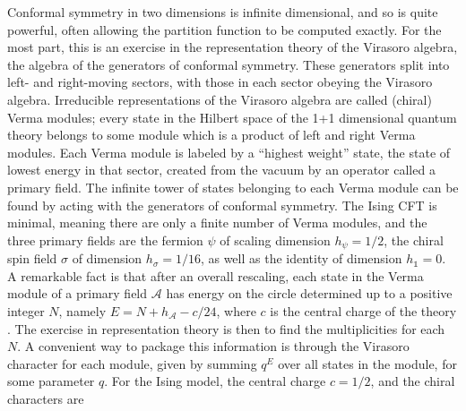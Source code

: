 \documentclass[11pt]{article}
\numberwithin{equation}{section}		%
\begin{document}
Conformal symmetry in two dimensions is infinite dimensional, and so is quite powerful, often allowing the partition function to be computed exactly. For the most part, this is an exercise in the representation theory of the Virasoro algebra, the algebra of the generators of conformal symmetry. These generators split into left- and right-moving sectors, with those in each sector obeying the Virasoro algebra. 
Irreducible representations of the Virasoro algebra are called (chiral) Verma modules; every state in the Hilbert space of the 1+1 dimensional quantum theory belongs to some module which is a product of left and right Verma modules.
Each Verma module is labeled by a ``highest weight'' state, the state of lowest energy in that sector, created from the vacuum by an operator called a primary field. The infinite tower of states belonging to each Verma module can be found by acting with the generators 
of conformal symmetry. 
The Ising CFT is minimal, meaning there are only a finite number of Verma modules, and the three primary fields are the fermion $\psi$ of scaling dimension $h_\psi=1/2$, the chiral spin field $\sigma$ of dimension $h_\sigma=1/16$, as well as the identity of dimension $h_{\mathds{1}}=0$. 
A remarkable fact is that after an overall rescaling, 
each state in the Verma module of a primary field $\mathcal{A}$ has energy on the circle determined up to a positive integer $N$, namely $E = N + h_\mathcal{A}-c/24$, where $c$ is the central charge of the theory \cite{Blote1986,Affleck1986,Cardy1986}.
The exercise in representation theory is then to find the multiplicities for each $N$. 
A convenient way to package this information is through the Virasoro character for each module, given by summing $q^E$ over all states in the module, for some parameter $q$.
For the Ising model, the central charge $c=1/2$, and the chiral characters are \cite{Cardy1986,Ginsparg}
\end{document}
